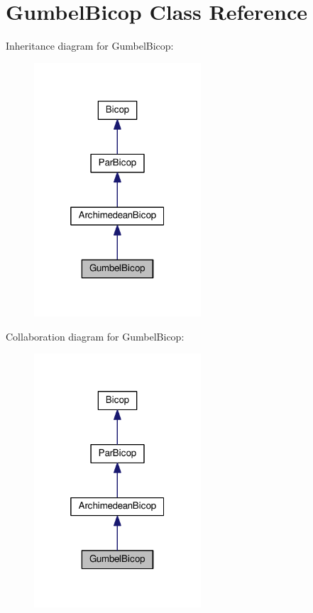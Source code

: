 \hypertarget{class_gumbel_bicop}{\section{Gumbel\+Bicop Class Reference}
\label{class_gumbel_bicop}
}


Inheritance diagram for Gumbel\+Bicop\+:
\nopagebreak
\begin{figure}[H]
\begin{center}
\leavevmode
\includegraphics[width=176pt]{class_gumbel_bicop__inherit__graph}
\end{center}
\end{figure}


Collaboration diagram for Gumbel\+Bicop\+:
\nopagebreak
\begin{figure}[H]
\begin{center}
\leavevmode
\includegraphics[width=176pt]{class_gumbel_bicop__coll__graph}
\end{center}
\end{figure}
